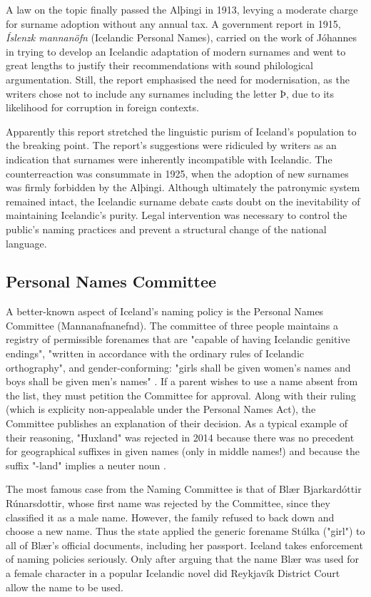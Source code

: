 A law on the topic finally passed the Alþingi in 1913, levying a moderate
charge for surname adoption without any annual tax. A government report in
1915, \textit{Íslenzk mannanöfn} (Icelandic Personal Names), carried on the
work of Jóhannes in trying to develop an Icelandic adaptation of modern
surnames and went to great lengths to justify their recommendations with sound
philological argumentation. Still, the report emphasised the need for
modernisation, as the writers chose not to include any surnames including the
letter Þ, due to its likelihood for corruption in foreign contexts.

Apparently this report stretched the linguistic purism of Iceland's population
to the breaking point. The report's suggestions were ridiculed by writers as an
indication that surnames were inherently incompatible with Icelandic. The
counterreaction was consummate in 1925, when the adoption of new surnames was
firmly forbidden by the Alþingi. Although ultimately the patronymic system
remained intact, the Icelandic surname debate casts doubt on the inevitability
of maintaining Icelandic's purity. Legal intervention was necessary to control
the public's naming practices and prevent a structural change of the national
language.

\subsection{Personal Names Committee}

A better-known aspect of Iceland's naming policy is the Personal Names
Committee (Mannanafnanefnd). The committee of three people maintains a registry
of permissible forenames that are "capable of having Icelandic genitive
endings", "written in accordance with the ordinary rules of Icelandic
orthography", and gender-conforming: "girls shall be given women's names and
boys shall be given men's names" \parencite{isl-names}. If a parent wishes to
use a name absent from the list, they must petition the Committee for approval.
Along with their ruling (which is explicity non-appealable under the Personal
Names Act), the Committee publishes an explanation of their decision. As a
typical example of their reasoning, "Huxland" was rejected in 2014 because
there was no precedent for geographical suffixes in given names (only in middle
names!) and because the suffix "-land" implies a neuter noun
\parencite{kyzer15}.

The most famous case from the Naming Committee is that of Blær Bjarkardóttir
Rúnarsdottir, whose first name was rejected by the Committee, since they
classified it as a male name. However, the family refused to back down and
choose a new name. Thus the state applied the generic forename Stúlka ("girl")
to all of Blær's official documents, including her passport. Iceland takes
enforcement of naming policies seriously. Only after arguing that the name Blær
was used for a female character in a popular Icelandic novel did Reykjavík
District Court allow the name to be used.

